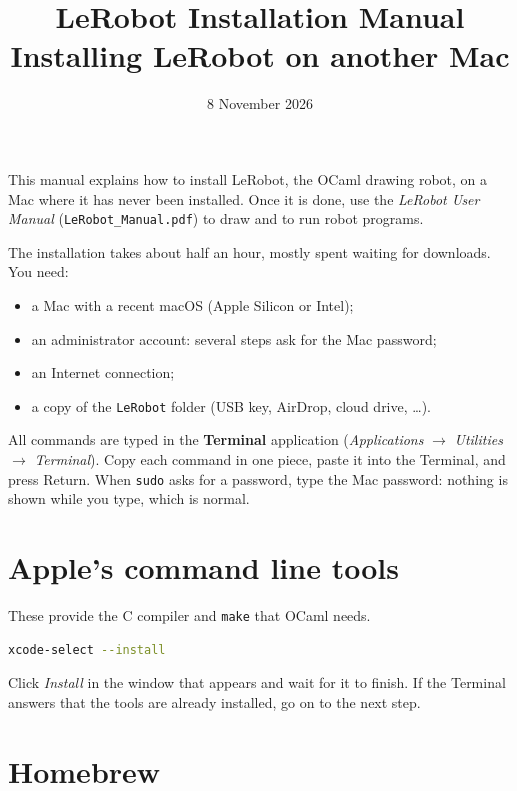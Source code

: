 \documentclass[11pt,a4paper]{article}
\title{LeRobot Installation Manual\\[0.3em]\large Installing LeRobot on another Mac}
\author{}
\date{8 November 2026}
\newcommand{\kbd}[1]{\texttt{#1}}
\begin{document}
\maketitle

This manual explains how to install LeRobot, the OCaml drawing robot, on a
Mac where it has never been installed. Once it is done, use the
\emph{LeRobot User Manual} (\kbd{LeRobot\_Manual.pdf}) to draw and to run
robot programs.

The installation takes about half an hour, mostly spent waiting for
downloads. You need:
\begin{itemize}
\item a Mac with a recent macOS (Apple Silicon or Intel);
\item an administrator account: several steps ask for the Mac password;
\item an Internet connection;
\item a copy of the \kbd{LeRobot} folder (USB key, AirDrop, cloud drive, \dots).
\end{itemize}

All commands are typed in the \textbf{Terminal} application
(\emph{Applications} $\rightarrow$ \emph{Utilities} $\rightarrow$
\emph{Terminal}). Copy each command in one piece, paste it into the
Terminal, and press Return. When \kbd{sudo} asks for a password, type the
Mac password: nothing is shown while you type, which is normal.

\tableofcontents

\section{Apple's command line tools}

These provide the C compiler and \kbd{make} that OCaml needs.
\begin{lstlisting}[language=bash]
xcode-select --install
\end{lstlisting}
Click \emph{Install} in the window that appears and wait for it to finish.
If the Terminal answers that the tools are already installed, go on to the
next step.

\section{Homebrew}
\end{document}
